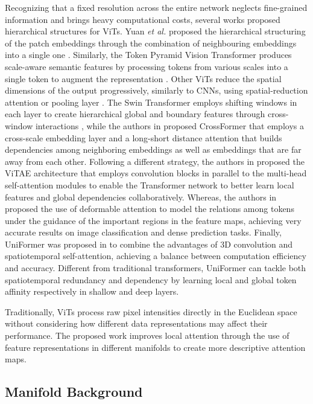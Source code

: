 \documentclass[10pt,twocolumn,letterpaper]{article}
\begin{document}
Recognizing that a fixed resolution across the entire network neglects fine-grained information and brings heavy computational costs, several works proposed hierarchical structures for ViTs. Yuan \emph{et al.} proposed the hierarchical structuring of the patch embeddings through the combination of neighbouring embeddings into a single one \cite{Author8}. Similarly, the Token Pyramid Vision Transformer produces scale-aware semantic features by processing tokens from various scales into a single token to augment the representation \cite{Author51}. Other ViTs reduce the spatial dimensions of the output progressively, similarly to CNNs, using spatial-reduction attention or pooling layer \cite{Author10,Author11}. The Swin Transformer employs shifting windows in each layer to create hierarchical global and boundary features through cross-window interactions \cite{Author9, Author65}, while the authors in \cite{Author64} proposed CrossFormer that employs a cross-scale embedding layer and a long-short distance attention that builds dependencies among neighboring embeddings as well as embeddings that are far away from each other. Following a different strategy, the authors in \cite{Author56} proposed the ViTAE architecture that employs convolution blocks in parallel to the multi-head self-attention modules to enable the Transformer network to better learn local features and global dependencies collaboratively. Whereas, the authors in \cite{Author67} proposed the use of deformable attention to model the relations among tokens under the guidance of the important regions in the feature maps, achieving very accurate results on image classification and dense prediction tasks. Finally, UniFormer was proposed in \cite{Author57} to combine the advantages of 3D convolution and spatiotemporal self-attention, achieving a balance between computation efficiency and accuracy. Different from traditional transformers, UniFormer can tackle both spatiotemporal redundancy and dependency by learning local and global token affinity respectively in shallow and deep layers. 

Traditionally, ViTs process raw pixel intensities directly in the Euclidean space without considering how different data representations may affect their performance. The proposed work improves local attention through the use of feature representations in different manifolds to create more descriptive attention maps.

\subsection{Manifold Background}
\end{document}
